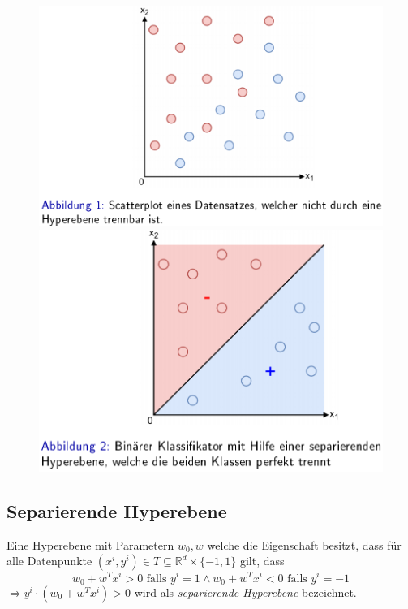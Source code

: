 \documentclass{report}
\begin{document}
  \begin{figure}[H]	
    \centering	
    \begin{minipage}[b]{0.4\textwidth}	
      \includegraphics[scale=.275]{ml06_1}	
    \end{minipage}	
    \hfill	
    \begin{minipage}[b]{0.4\textwidth}	
      \includegraphics[scale=.275]{ml06_2}	
    \end{minipage}	
  \end{figure}	
  
  \subsection{Separierende Hyperebene}	
  Eine Hyperebene mit Parametern $w_0, w$ welche die Eigenschaft besitzt, dass für alle Datenpunkte	
  $(x^i, y^i)\in T\subseteq \mathbb{R}^d \times \{-1, 1\}$ gilt, dass	
  $$w_0 + w^Tx^i > 0 \text{ falls } y^i = 1 \land w_0 + w^Tx^i < 0 \text{ falls } y^i = -1$$	
  $\Rightarrow y^i\cdot (w_0 + w^Tx^i) > 0$ wird als \textit{separierende Hyperebene} bezeichnet.	
  
\end{document}
